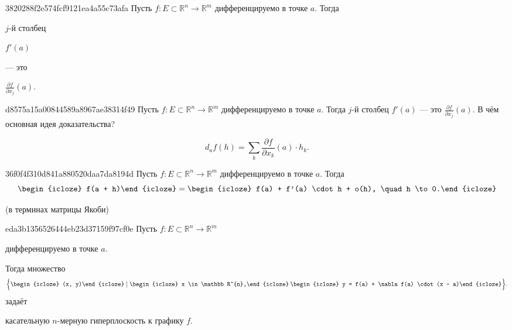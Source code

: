 \begin{note}{3820288f2e574fcf9121ea4a55c73afa}
    Пусть \({ f : E \subset \mathbb R^{n} \to \mathbb R^{m} }\) дифференцируемо в точке \({ a }\).
    Тогда \begin{icloze}{2}\({ j }\)-й столбец\end{icloze} \begin{icloze}{3}\({ f'(a) }\)\end{icloze} --- это \begin{icloze}{1}\({ \frac{\partial f}{\partial x_j}(a) }\).\end{icloze}
\end{note}

\begin{note}{d8575a15a00844589a8967ae38314f49}
    Пусть \({ f : E \subset \mathbb R^{n} \to \mathbb R^{m} }\) дифференцируемо в точке \({ a }\).
    Тогда \({ j }\)-й столбец \({ f'(a) }\) --- это \({ \frac{\partial f}{\partial x_j}(a) }\).
    В чём основная идея доказательства?

    \begin{cloze}{1}
        \[
            d_{a}f(h) = \sum_{k}^{} \frac{\partial f}{\partial x_k}(a) \cdot h_k.
        \]
    \end{cloze}
\end{note}

\begin{note}{36f0f4f310d841a880520daa7da8194d}
    Пусть \({ f : E \subset \mathbb R^{n} \to \mathbb R^{m} }\) дифференцируемо в точке \({ a }\).
    Тогда
    \[
        \begin{icloze}{2}f(a + h)\end{icloze} = \begin{icloze}{1}f(a) + f'(a) \cdot h + o(h), \quad h \to 0.\end{icloze}
    \]

    \begin{center}
        \tiny
        (в терминах матрицы Якоби)
    \end{center}
\end{note}

\begin{note}{eda3b1356526444eb23d37159f97cf0e}
    Пусть \({ f : E \subset \mathbb R^{n} \to \mathbb R^{m} }\) \begin{icloze}{5}дифференцируемо в точке \({ a }\).\end{icloze}
    Тогда множество
    \[
        \Big\{ \begin{icloze}{4}(x, y)\end{icloze} \mid \begin{icloze}{3}x \in \mathbb R^{n},\end{icloze}\: \begin{icloze}{2}y = f(a) + \nabla f(a) \cdot (x - a)\end{icloze} \Big\}.
    \]
    задаёт \begin{icloze}{1}касательную \({ n }\)-мерную гиперплоскость к графику \({ f }\).\end{icloze}
\end{note}

